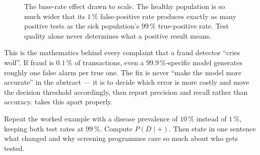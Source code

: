 \begin{figure}[htbp]
\centering
{}
\caption{The base-rate effect drawn to scale. The healthy population is so much
wider that its $1\,\%$ false-positive rate produces exactly as many positive
tests as the sick population's $99\,\%$ true-positive rate. Test quality alone
never determines what a positive result means.}
\label{fig:math-base-rate}
\end{figure}

\begin{engineernote}
This is the mathematics behind every complaint that a fraud detector ``cries
wolf''. If fraud is $0.1\,\%$ of transactions, even a $99.9\,\%$-specific model
generates roughly one false alarm per true one. The fix is never ``make the
model more accurate'' in the abstract --- it is to decide which error is more
costly and move the decision threshold accordingly, then report precision and
recall rather than accuracy.  takes this apart
properly.
\end{engineernote}

\begin{checkpoint}
Repeat the worked example with a disease prevalence of $10\,\%$ instead of
$1\,\%$, keeping both test rates at $99\,\%$. Compute $P(D\mid+)$. Then state
in one sentence what changed and why screening programmes care so much about
who gets tested.
\end{checkpoint}

